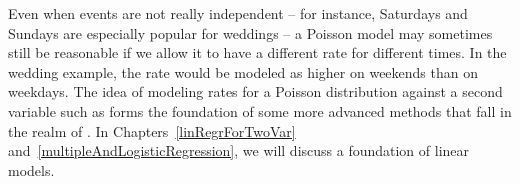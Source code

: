 Even when events are not really independent -- for instance, Saturdays and Sundays are especially popular for weddings -- a Poisson model may sometimes still be reasonable if we allow it to have a different rate for different times. In the wedding example, the rate would be modeled as higher on weekends than on weekdays. The idea of modeling rates for a Poisson distribution against a second variable such as  forms the foundation of some more advanced methods that fall in the realm of . In Chapters~\ref{linRegrForTwoVar} and~\ref{multipleAndLogisticRegression}, we will discuss a foundation of linear models.



